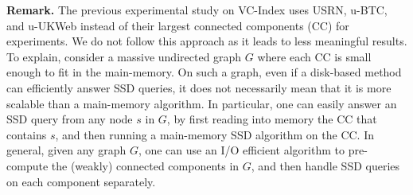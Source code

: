 \documentclass{sig-alternate}
\def\header{\vspace{2mm} \noindent}
\begin{document}
\begin{sloppy}

\header
{\bf Remark.} The previous experimental study on VC-Index \cite{ckcc12} uses USRN, u-BTC, and u-UKWeb instead of their largest connected components (CC) for experiments. We do not follow this approach as it leads to less meaningful results. To explain, consider a massive undirected graph $G$ where each CC is small enough to fit in the main-memory. On such a graph, even if a disk-based method can efficiently answer SSD queries, it does not necessarily mean that it is more scalable than a main-memory algorithm. In particular, one can easily answer an SSD query from any node $s$ in $G$, by first reading into memory the CC that contains $s$, and then running a main-memory SSD algorithm on the CC. In general, given any graph $G$, one can use an I/O efficient algorithm \cite{mr99} to pre-compute the (weakly) connected components in $G$, and then handle SSD queries on each component separately.
%
%


\end{sloppy}
\end{document}
